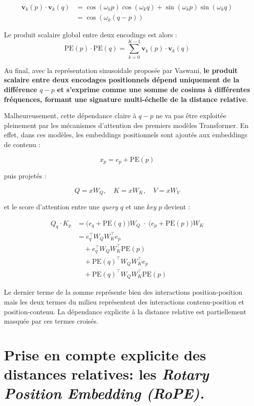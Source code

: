 \documentclass{article}
\begin{document}
\begin{align}
\mathbf{v}_k(p)\cdot \mathbf{v}_k(q)
&= \cos(\omega_k p)\cos(\omega_k q) + \sin(\omega_k p)\sin(\omega_k q) \\
&= \cos(\omega_k(q-p))
\end{align}

Le produit scalaire global entre deux encodings est alors :
\[
\mathrm{PE}(p)\cdot \mathrm{PE}(q)
=
\sum_{k=0}^{K-1}
\mathbf{v}_k(p)\cdot \mathbf{v}_k(q)
\]


Au final, avec la représentation sinusoidale proposée par Vaswani, \textbf{le produit scalaire entre deux encodages positionnels dépend uniquement de la différence $q-p$ et s’exprime comme une somme de cosinus à différentes fréquences, formant une signature multi-échelle de la distance relative}.


Malheureusement, cette dépendance claire à $q-p$ ne va pas être exploitée pleinement par les mécanismes d'attention des premiers modèles Transformer. En effet, dans ces modèles, les embeddings positionnels sont ajoutés aux embeddings de contenu :

\[
x_p = e_p + \mathrm{PE}(p)
\]

puis projetés :

\[
Q = xW_Q,\quad K = xW_K,\quad V = xW_V
\]

et le score d'attention entre une \textit{query} $q$ et une \textit{key} $p$ devient :

\[
\begin{aligned}
Q_q \cdot K_p
&=
\big(e_q + \mathrm{PE}(q)\big) W_Q
\;\cdot\;
\big(e_p + \mathrm{PE}(p)\big) W_K \\
&=
e_q^\top W_Q W_K^\top e_p \\
&\quad + e_q^\top W_Q W_K^\top \mathrm{PE}(p) \\
&\quad + \mathrm{PE}(q)^\top W_Q W_K^\top e_p \\
&\quad + \mathrm{PE}(q)^\top W_Q W_K^\top \mathrm{PE}(p)
\end{aligned}
\]

Le dernier terme de la somme représente bien des interactions position-position mais les deux termes du milieu représentent des interactions contenu-position et position-contenu. La dépendance explicite à la distance relative est partiellement masquée par ces termes croisés.


\section{Prise en compte explicite des distances relatives: les \textit{Rotary Position Embedding (RoPE).}}
\end{document}
